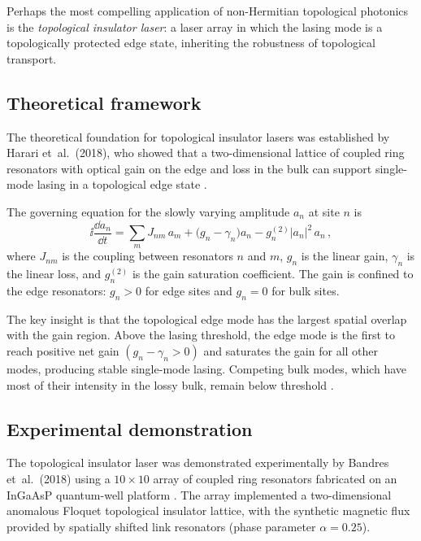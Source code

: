 Perhaps the most compelling application of non-Hermitian topological
photonics is the \emph{topological insulator laser}: a laser array
in which the lasing mode is a topologically protected edge state,
inheriting the robustness of topological transport.

\subsection{Theoretical framework}
\label{sec:ch17-ti-laser-theory}

The theoretical foundation for topological insulator lasers was
established by Harari et~al.\ (2018), who showed that a
two-dimensional lattice of coupled ring resonators with optical gain
on the edge and loss in the bulk can support single-mode lasing in
a topological edge state \cite{harari2018topological}.

The governing equation for the slowly varying amplitude $a_n$ at
site $n$ is
\begin{equation}\label{eq:ch17-laser-amplitude}
  \ii\frac{\dd a_n}{\dd t}
  = \sum_m J_{nm}\,a_m
  + \bigl(g_n - \gamma_n\bigr)a_n
  - g_n^{(2)}|a_n|^2\,a_n\,,
\end{equation}
where $J_{nm}$ is the coupling between resonators $n$ and $m$,
$g_n$ is the linear gain, $\gamma_n$ is the linear loss, and
$g_n^{(2)}$ is the gain saturation coefficient.  The gain is
confined to the edge resonators: $g_n>0$ for edge sites and
$g_n=0$ for bulk sites.

The key insight is that the topological edge mode has the largest
spatial overlap with the gain region.  Above the lasing threshold,
the edge mode is the first to reach positive net gain
$(g_n-\gamma_n>0)$ and saturates the gain for all other modes,
producing stable single-mode lasing.  Competing bulk modes, which
have most of their intensity in the lossy bulk, remain below
threshold \cite{harari2018topological,ozawa2018topological}.

\subsection{Experimental demonstration}
\label{sec:ch17-ti-laser-experiment}

The topological insulator laser was demonstrated experimentally by
Bandres et~al.\ (2018) using a $10\times 10$ array of coupled ring
resonators fabricated on an InGaAsP quantum-well platform
\cite{bandres2018topologicala}.  The array implemented a
two-dimensional anomalous Floquet topological insulator lattice,
with the synthetic magnetic flux provided by spatially shifted link
resonators (phase parameter $\alpha=0.25$).

